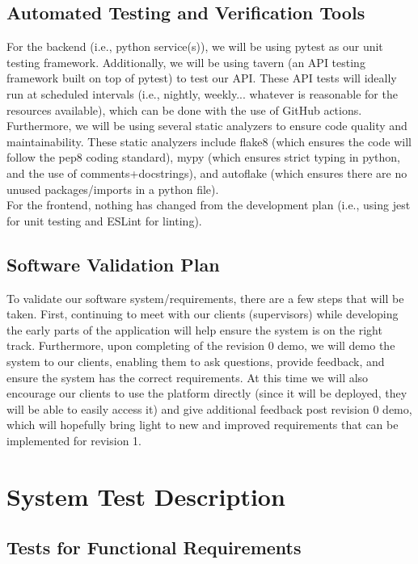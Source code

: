 \documentclass[12pt, titlepage]{article}
\begin{document}
\subsection{Automated Testing and Verification Tools}

For the backend (i.e., python service(s)), we will be using pytest as our unit testing framework. Additionally,
we will be using tavern (an API testing framework built on top of pytest) to test our API. These API tests will
ideally run at scheduled intervals (i.e., nightly, weekly... whatever is reasonable for the resources available), which can be 
done with the use of GitHub actions. Furthermore, we will be using several static analyzers to ensure code quality and maintainability. These 
static analyzers include flake8 (which ensures the code will follow the pep8 coding standard), mypy (which ensures strict typing in python,
and the use of comments+docstrings), and autoflake (which ensures there are no unused packages/imports in a python file).\\

For the frontend, nothing has changed from the development plan (i.e., using jest for unit testing and ESLint for linting).

\subsection{Software Validation Plan}

To validate our software system/requirements, there are a few steps that will be taken. First, continuing to meet with our clients (supervisors) while developing
the early parts of the application will help ensure the system is on the right track. Furthermore, upon completing of the revision 0 demo, we will
demo the system to our clients, enabling them to ask questions, provide feedback, and ensure the system has the correct requirements. At this
time we will also encourage our clients to use the platform directly (since it will be deployed, they will be able to easily access it) and give additional feedback post revision 0 demo,
which will hopefully bring light to new and improved requirements that can be implemented for revision 1. 

\section{System Test Description}
	
\subsection{Tests for Functional Requirements}
\end{document}

